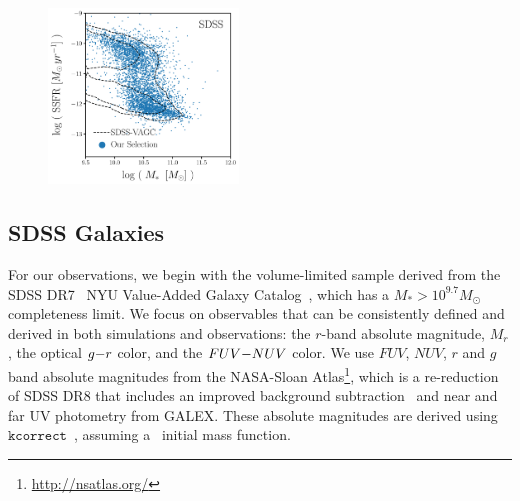 \begin{figure}
\begin{center}
\includegraphics[width=0.45\textwidth]{figs/sdss_selection.pdf} 
    \caption{\label{fig:sdss_sel}
    }
\end{center}
\end{figure}


\subsection{SDSS Galaxies} \label{sec:obs} 
For our observations, we 
begin with the volume-limited \cite{tinker2011} sample derived from the SDSS
DR7~\citep{abazajian2009} NYU Value-Added Galaxy
Catalog~\citep[VAGC;][]{blanton2005}, which has a $M_* > 10^{9.7} M_\odot$
completeness limit. 
We focus on observables that can be consistently defined and derived in both simulations 
and observations: the $r$-band absolute magnitude, $M_r$, the optical $g{-}r$
color, and the $FUV{-}NUV$ color. 
We use $FUV$, $NUV$, $r$ and $g$ band absolute magnitudes from the NASA-Sloan
Atlas\footnote{\url{http://nsatlas.org/}}, which is a re-reduction of SDSS DR8
\citep{aihara2011} that includes an improved background subtraction~\citep{blanton2011} 
and near and far UV photometry from GALEX. These absolute magnitudes are
derived using $\mathtt{kcorrect}$~\citep{blanton2007a}, assuming
a~\cite{chabrier2003} initial mass function. 

